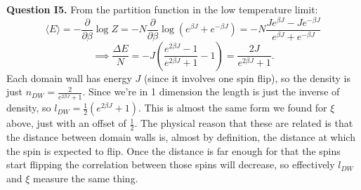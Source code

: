 \documentclass[letterpaper, reqno,11pt]{article}
\begin{document}
{\medskip\noindent\bf Question I5.} From the partition function in the low temperature limit:
\[
\langle E \rangle =- \frac{\partial}{\partial\beta}\log Z=-N\frac{\partial}{\partial\beta}\log\left( e^{\beta J}+e^{-\beta J} \right)=-N \frac{Je^{\beta J}-Je^{-\beta J}}{e^{\beta J}+e^{-\beta J}}
\]
\[
\implies \frac{\Delta E}{N}= -J\left(\frac{e^{2\beta J}-1}{e^{2\beta J}+1}-1\right)= \frac{2J}{e^{2\beta J}+1}
.\]
Each domain wall has energy $J$ (since it involves one spin flip), so the density is just $n_{DW}= \frac{2}{e^{2\beta J}+1}$. Since we're in 1 dimension the length is just the inverse of density, so $l_{DW}=\frac{1}{2}\left( e^{2\beta J}+1 \right) $. This is almost the same form we found for $\xi$ above, just with an offset of $\frac{1}{2}$. The physical reason that these are related is that the distance between domain walls is, almost by definition, the distance at which the spin is expected to flip. Once the distance is far enough for that the spins start flipping the correlation between those spins will decrease, so effectively $l_{DW}$ and $\xi$ measure the same thing.
\end{document}
